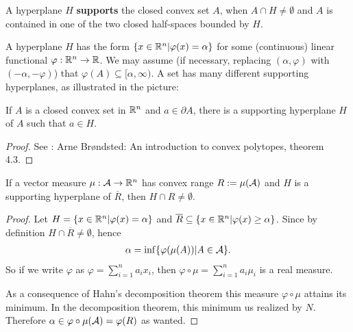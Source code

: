 \begin{definition}
A hyperplane $H$ \textbf{supports} the closed convex set $A$, when $A\cap H\neq \emptyset$ and $A$ is contained in one of the two closed half-spaces bounded by $H$.

A hyperplane $H$ has the form $\{x\in \mathbb{R}^{n}|\varphi(x) = \alpha \}$ for some (continuous) linear functional $\varphi: \mathbb{R}^{n} \to \mathbb{R}$. We may assume (if necessary, replacing $(\alpha, \varphi)$ with $(-\alpha, -\varphi)$) that $\varphi(A)\subseteq [\alpha, \infty)$.
A set has many different supporting hyperplanes, as illustrated in the picture:
\begin{center}
\end{center}
\end{definition}

\begin{theorem}\label{thm: hyperplane}
If $A$ is a closed convex set in $\mathbb{R}^{n}$ and $a\in \partial A$, there is a supporting hyperplane $H$ of $A$ such that $a\in H$.
\end{theorem}
\begin{proof}
See \cite{Brondsted82}: Arne Brøndsted: An introduction to convex polytopes, theorem 4.3.
\end{proof}

\begin{lemma}\label{lem: non-empty hyperplane cap}
If a vector measure $\mu:\mathcal{A}\to \mathbb{R}^{n}$ has convex range $R:=\mu(\mathcal{A})$ and $H$ is a supporting hyperplane of $\overline{R}$, then $H\cap R \neq \emptyset$.
\end{lemma}
\begin{proof}
Let $H=\{x\in \mathbb{R}^{n} | \varphi(x) = \alpha \}$ and $\overline{R}\subseteq \{x\in \mathbb{R}^{n} | \varphi(x) \ge \alpha\}$. Since by definition $H\cap \overline{R}\neq \emptyset$, hence
\begin{align*}
	\alpha=\inf\{ \varphi(\mu(A)) | A \in \mathcal{A} \}.
\end{align*}
So if we write $\varphi$ as $\varphi=\sum_{i=1}^{n}a_{i}x_{i}$, then $\varphi\circ\mu=\sum_{i=1}^{n}a_{i}\mu_{i}$ is a real measure.

As a consequence of Hahn's decomposition theorem this measure $\varphi \circ \mu$ attains its minimum. In the decomposition theorem, this minimum us realized by $N$.
Therefore $\alpha\in \varphi\circ \mu(\mathcal{A})=\varphi(R)$ as wanted.
\end{proof}

